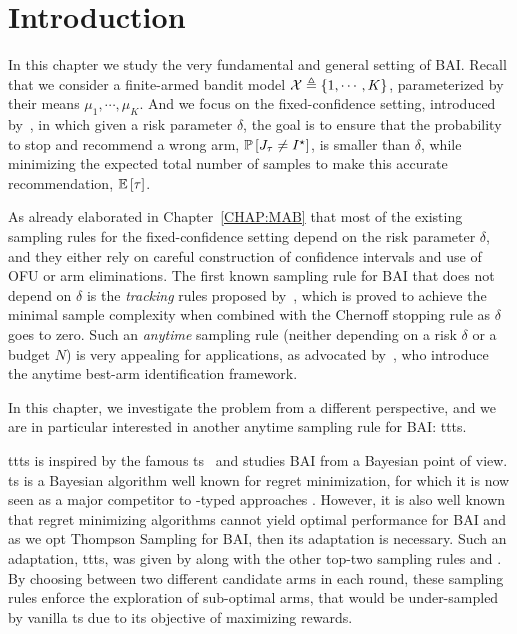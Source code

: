\section{Introduction}\label{sec:t3c.intro}

In this chapter we study the very fundamental and general setting of BAI. Recall that we consider a finite-armed bandit model $\mathcal{X}\triangleq\{1,\cdots,K\}$, parameterized by their means $\mu_1, \cdots, \mu_K$. And we focus on the fixed-confidence setting, introduced by~\cite{even-dar2003confidence}, in which given a risk parameter $\delta$, the goal is to ensure that the probability to stop and recommend a wrong arm, $\mathbb{P}\left[J_\tau \neq I^\star\right]$, is smaller than $\delta$, while minimizing the expected total number of samples to make this accurate recommendation, $\mathbb{E}\left[\tau\right]$. 


As already elaborated in Chapter~\ref{CHAP:MAB} that most of the existing sampling rules for the fixed-confidence setting depend on the risk parameter $\delta$, and they either rely on careful construction of confidence intervals and use of OFU or arm eliminations. The first known sampling rule for BAI that does not depend on $\delta$ is the \emph{tracking} rules proposed by~\cite{garivier2016tracknstop}, which is proved to achieve the minimal sample complexity when combined with the Chernoff stopping rule as $\delta$ goes to zero. Such an \emph{anytime} sampling rule (neither depending on a risk $\delta$ or a budget $N$) is very appealing for applications, as advocated by~\cite{jun2016atlucb}, who introduce the anytime best-arm identification framework. 


In this chapter, we investigate the problem from a different perspective, and we are in particular interested in another anytime sampling rule for BAI: \gls{ttts}. 

\gls{ttts} is inspired by the famous \gls{ts}~\citep{thompson1933} and studies BAI from a Bayesian point of view. \gls{ts} is a Bayesian algorithm well known for regret minimization, for which it is now seen as a major competitor to \UCB-typed approaches \citep{burnetas1996optimal,auer2002ucb,cappe2013klucb}. However, it is also well known that regret minimizing algorithms cannot yield optimal performance for BAI \citep{bubeck2011pure,kaufmann2017survey} and as we opt Thompson Sampling for BAI, then its adaptation is necessary. Such an adaptation, \gls{ttts}, was given by \citet{russo2016ttts} along with the other top-two sampling rules \TTPS and \TTVS. By choosing between two different candidate arms in each round, these sampling rules enforce the exploration of sub-optimal arms, that would be under-sampled by vanilla \gls{ts} due to its objective of maximizing rewards.

